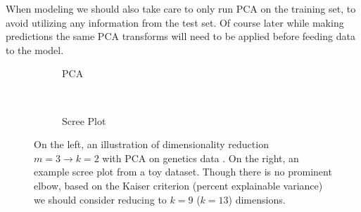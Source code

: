 When modeling we should also take care to only run PCA on the training set,
to avoid utilizing any information from the test set.
Of course later while making predictions the same PCA transforms
will need to be applied before feeding data to the model.

\begin{figure}[H]
  \centering

  \begin{subfigure}[b]{0.48\textwidth}\centering
    \usebox{\largestimage}
    \vspace{0.01cm}
  \caption{PCA}
  \label{fig:dim_reduct:PCA:illustration}
  \end{subfigure}
  ~
  \begin{subfigure}[b]{\wd\largestimage}\centering
  \caption{Scree Plot}
  \label{fig:dim_reduct:PCA:scree}
  \end{subfigure}
\caption{
On the left, an illustration of dimensionality reduction $m=3 \to k=2$ with PCA on genetics data \cite{Scholz2006}.
On the right, an example scree plot from a toy dataset.
Though there is no prominent elbow,
based on the Kaiser criterion (percent explainable variance)
we should consider reducing to $k=9$ ($k=13$) dimensions.
\label{fig:dim_reduct:PCA}
}
\end{figure}

